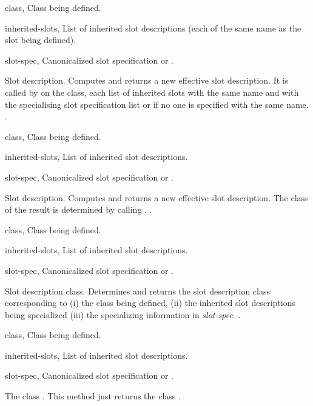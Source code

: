 \begin{optDefinition}
%
\begin{genericargs}
    \item[class, \classref{class}] Class being defined.
    \item[inherited-slots, \classref{list}] List of inherited slot descriptions
    (each of the same name as the slot being defined).
    \item[slot-spec, \classref{list}] Canonicalized slot specification or \nil{}.
\end{genericargs}
%
\result%
Slot description.
%
\remarks%
Computes and returns a new effective slot description. It is called by
 on the class, each list of inherited
slots with the same name and with the specialising slot specification
list or \nil{}\/ if no one is specified with the same name.
%
\seealso%
.

%
\begin{specargs}
    \item[class, \classref{class}] Class being defined.
    \item[inherited-slots, \classref{list}] List of inherited slot descriptions.
    \item[slot-spec, \classref{list}] Canonicalized slot specification or \nil{}.
\end{specargs}
%
\result%
Slot description.
%
\remarks%
Computes and returns a new effective slot description.  The class of the result
is determined by calling
.
%
\seealso%
.

%
\begin{genericargs}
    \item[class, \classref{class}] Class being defined.
    \item[inherited-slots, \classref{list}] List of inherited slot descriptions.
    \item[slot-spec, \classref{list}] Canonicalized slot specification or
    \nil{}.
\end{genericargs}
%
\result%
Slot description class.
%
\remarks%
Determines and returns the slot description class corresponding to (i)
the class being defined, (ii) the inherited slot descriptions being
specialized (iii) the specializing information in {\em slot-spec}.
%
\seealso%
.

%
\begin{specargs}
    \item[class, \classref{class}] Class being defined.
    \item[inherited-slots, \classref{list}] List of inherited slot
    descriptions.
    \item[slot-spec, \classref{list}] Canonicalized slot specification or
    \nil{}.
\end{specargs}
%
\result%
The class .
%
\remarks%
This method just returns the class .
%
\end{optDefinition}

